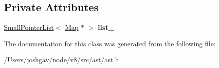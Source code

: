 \subsection*{Private Attributes}
\begin{DoxyCompactItemize}
\item 
\hyperlink{classv8_1_1internal_1_1_small_pointer_list}{Small\+Pointer\+List}$<$ \hyperlink{classv8_1_1internal_1_1_map}{Map} $\ast$ $>$ {\bfseries list\+\_\+}\hypertarget{classv8_1_1internal_1_1_small_map_list_a42dce7afcde0d49ecd7de0b3ce43e82b}{}\label{classv8_1_1internal_1_1_small_map_list_a42dce7afcde0d49ecd7de0b3ce43e82b}

\end{DoxyCompactItemize}


The documentation for this class was generated from the following file\+:\begin{DoxyCompactItemize}
\item 
/\+Users/joshgav/node/v8/src/ast/ast.\+h\end{DoxyCompactItemize}
